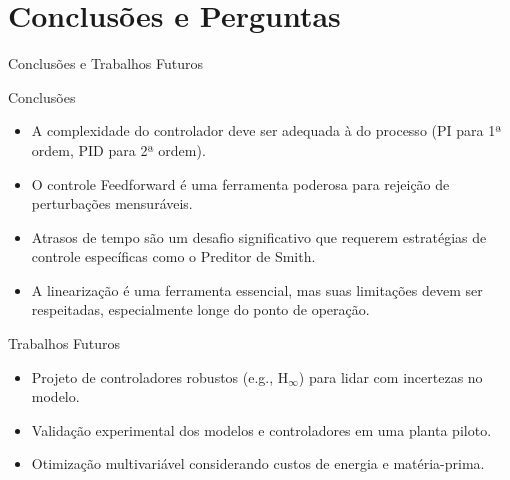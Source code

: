 \documentclass{beamer}
\begin{document}
\section{Conclusões e Perguntas}

\begin{frame}{Conclusões e Trabalhos Futuros}
    \begin{block}{Conclusões}
        \begin{itemize}
            \item A complexidade do controlador deve ser adequada à do processo (PI para 1ª ordem, PID para 2ª ordem).
            \item O controle Feedforward é uma ferramenta poderosa para rejeição de perturbações mensuráveis.
            \item Atrasos de tempo são um desafio significativo que requerem estratégias de controle específicas como o Preditor de Smith.
            \item A linearização é uma ferramenta essencial, mas suas limitações devem ser respeitadas, especialmente longe do ponto de operação.
        \end{itemize}
    \end{block}
    
    \begin{block}{Trabalhos Futuros}
        \begin{itemize}
            \item Projeto de controladores robustos (e.g., H\(_\infty\)) para lidar com incertezas no modelo.
            \item Validação experimental dos modelos e controladores em uma planta piloto.
            \item Otimização multivariável considerando custos de energia e matéria-prima.
        \end{itemize}
    \end{block}
\end{frame}
\end{document}
